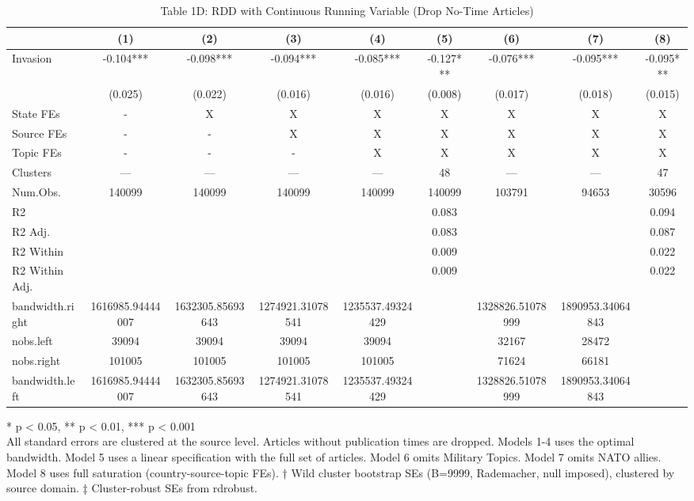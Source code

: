 \begin{table}[t]
\caption{\label{tab:table1d}Table 1D: RDD with Continuous Running Variable (Drop No-Time Articles)} 
\fontsize{12.0pt}{14.0pt}\selectfont
\begin{tabular*}{\linewidth}{@{\extracolsep{\fill}}lcccccccc}
\toprule
  & (1) & (2) & (3) & (4) & (5) & (6) & (7) & (8) \\ 
\midrule\addlinespace[2.5pt]
Invasion & -0.104*** & -0.098*** & -0.094*** & -0.085*** & -0.127*** & -0.076*** & -0.095*** & -0.095*** \\ 
{} & {(0.025)} & {(0.022)} & {(0.016)} & {(0.016)} & {(0.008)} & {(0.017)} & {(0.018)} & {(0.015)} \\ 
State FEs & - & X & X & X & X & X & X & X \\ 
Source FEs & - & - & X & X & X & X & X & X \\ 
Topic FEs & - & - & - & X & X & X & X & X \\ 
Clusters & — & — & — & — & 48 & — & — & 47 \\ 
Num.Obs. & 140099 & 140099 & 140099 & 140099 & 140099 & 103791 & 94653 & 30596 \\ 
R2 &  &  &  &  & 0.083 &  &  & 0.094 \\ 
R2 Adj. &  &  &  &  & 0.083 &  &  & 0.087 \\ 
R2 Within &  &  &  &  & 0.009 &  &  & 0.022 \\ 
R2 Within Adj. &  &  &  &  & 0.009 &  &  & 0.022 \\ 
bandwidth.right & 1616985.94444007 & 1632305.85693643 & 1274921.31078541 & 1235537.49324429 &  & 1328826.51078999 & 1890953.34064843 &  \\ 
nobs.left & 39094 & 39094 & 39094 & 39094 &  & 32167 & 28472 &  \\ 
nobs.right & 101005 & 101005 & 101005 & 101005 &  & 71624 & 66181 &  \\ 
bandwidth.left & 1616985.94444007 & 1632305.85693643 & 1274921.31078541 & 1235537.49324429 &  & 1328826.51078999 & 1890953.34064843 &  \\ 
\bottomrule
\end{tabular*}
\begin{minipage}{\linewidth}
\vspace{.05em}
* p < 0.05, ** p < 0.01, *** p < 0.001\\
All standard errors are clustered at the source level. Articles without
publication times are dropped. Models 1-4 uses the optimal bandwidth. Model
5 uses a linear specification with the full set of articles. Model 6 omits
Military Topics. Model 7 omits NATO allies. Model 8 uses full saturation
(country-source-topic FEs). † Wild cluster bootstrap SEs (B=9999, Rademacher,
null imposed), clustered by source domain. ‡ Cluster-robust SEs from rdrobust.\\
\end{minipage}
\end{table}

